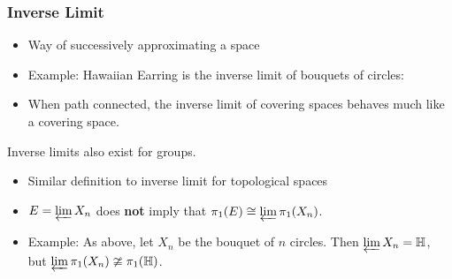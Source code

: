 \documentclass{beamer}
\newcommand{\HE}{\mathbb{H}}
\begin{document}
\begin{frame}[allowframebreaks]
\frametitle{Inverse Limit}
\begin{itemize}
\item  Way of successively approximating a space
\item  Example:  Hawaiian Earring is the inverse limit of bouquets of circles:
\begin{figure}[h]
\centering{
\resizebox{8cm}{!}{\fontsize{40}{48}\selectfont {inverse_limit.pdf_tex}}
}
\end{figure}

\item  When path connected, the inverse limit of covering spaces behaves much like a covering space.
\end{itemize}

\pagebreak

Inverse limits also exist for groups.
\begin{itemize}
\item  Similar definition to inverse limit for topological spaces
\item  $E = \varprojlim X_n$ does \textbf{not} imply that $\pi_1(E) \cong \varprojlim \pi_1(X_n)$.
\item  Example:  As above, let $X_n$ be the bouquet of $n$ circles.  Then $\varprojlim X_n = \HE$, but $\varprojlim \pi_1(X_n) \ncong \pi_1(\HE)$.
\end{itemize}

\begin{figure}[h]
\centering{
\resizebox{8cm}{!}{\fontsize{40}{48}\selectfont {inverse_limit.pdf_tex}}
}
\end{figure}
\end{frame}
\end{document}
